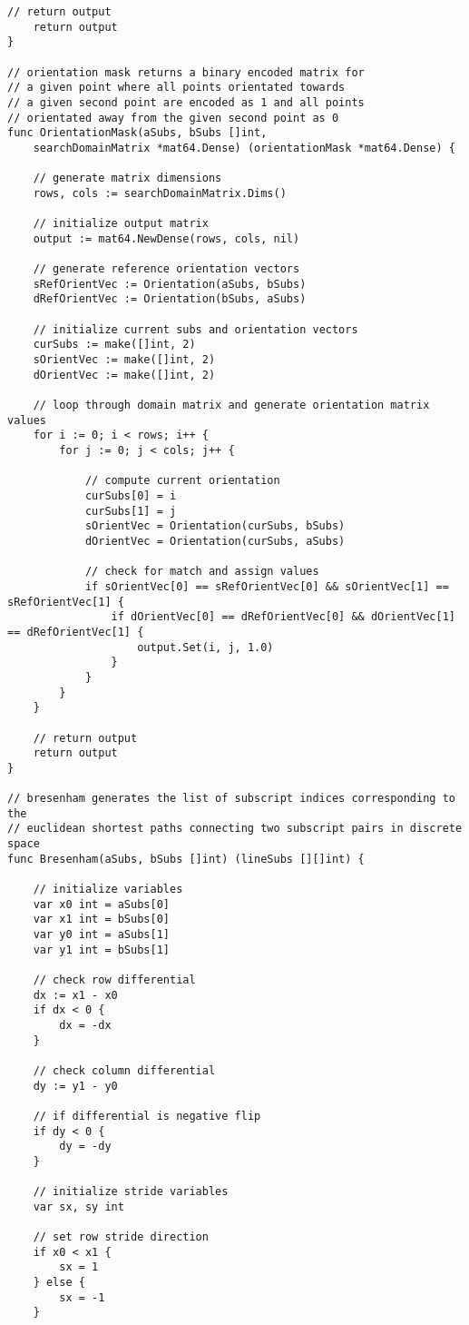 \begin{lstlisting}[basicstyle=\tiny]
	// return output
	return output
}

// orientation mask returns a binary encoded matrix for
// a given point where all points orientated towards
// a given second point are encoded as 1 and all points
// orientated away from the given second point as 0
func OrientationMask(aSubs, bSubs []int, 
    searchDomainMatrix *mat64.Dense) (orientationMask *mat64.Dense) {

	// generate matrix dimensions
	rows, cols := searchDomainMatrix.Dims()

	// initialize output matrix
	output := mat64.NewDense(rows, cols, nil)

	// generate reference orientation vectors
	sRefOrientVec := Orientation(aSubs, bSubs)
	dRefOrientVec := Orientation(bSubs, aSubs)

	// initialize current subs and orientation vectors
	curSubs := make([]int, 2)
	sOrientVec := make([]int, 2)
	dOrientVec := make([]int, 2)

	// loop through domain matrix and generate orientation matrix values
	for i := 0; i < rows; i++ {
		for j := 0; j < cols; j++ {

			// compute current orientation
			curSubs[0] = i
			curSubs[1] = j
			sOrientVec = Orientation(curSubs, bSubs)
			dOrientVec = Orientation(curSubs, aSubs)

			// check for match and assign values
			if sOrientVec[0] == sRefOrientVec[0] && sOrientVec[1] == sRefOrientVec[1] {
				if dOrientVec[0] == dRefOrientVec[0] && dOrientVec[1] == dRefOrientVec[1] {
					output.Set(i, j, 1.0)
				}
			}
		}
	}

	// return output
	return output
}

// bresenham generates the list of subscript indices corresponding to the
// euclidean shortest paths connecting two subscript pairs in discrete space
func Bresenham(aSubs, bSubs []int) (lineSubs [][]int) {

	// initialize variables
	var x0 int = aSubs[0]
	var x1 int = bSubs[0]
	var y0 int = aSubs[1]
	var y1 int = bSubs[1]

	// check row differential
	dx := x1 - x0
	if dx < 0 {
		dx = -dx
	}

	// check column differential
	dy := y1 - y0

	// if differential is negative flip
	if dy < 0 {
		dy = -dy
	}

	// initialize stride variables
	var sx, sy int

	// set row stride direction
	if x0 < x1 {
		sx = 1
	} else {
		sx = -1
	}


\end{lstlisting}
